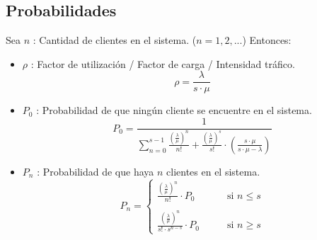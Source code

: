 \documentclass{templateNote}
\begin{document}
\subsection{Probabilidades}
Sea $n$ : Cantidad de clientes en el sistema. ($n=1,2,...$)
Entonces:
\begin{itemize}
    \item $\rho$ : Factor de utilizaci\'on / Factor de carga / Intensidad tr\'afico.
    \begin{equation*}
        \rho = \frac{\lambda}{s \cdot \mu}
    \end{equation*}

    \item $P_0$ : Probabilidad de que ning\'un cliente se encuentre en el sistema.
    \begin{equation*}
        P_0 = \frac{1}{\displaystyle\sum_{n=0}^{s-1}{\frac{\left(\frac{\lambda}{\mu}\right)^n}{n!} + \frac{\left(\frac{\lambda}{\mu}\right)^s}{s!} \cdot \left(\frac{s \cdot \mu}{s \cdot \mu - \lambda}\right)}}
    \end{equation*}
    
    \item $P_n$ : Probabilidad de que haya $n$ clientes en el sistema.
    \begin{equation*}
        P_n = \begin{cases}
            \displaystyle\frac{\left(\frac{\lambda}{\mu}\right)^n}{n!} \cdot P_0 & \qquad \text{si } n \leq s \\
            \\
            \displaystyle\frac{\left(\frac{\lambda}{\mu}\right)^n}{s! \cdot s^{n-s}} \cdot P_0 & \qquad \text{si } n \geq s
        \end{cases}
    \end{equation*}


\end{itemize}
\end{document}

